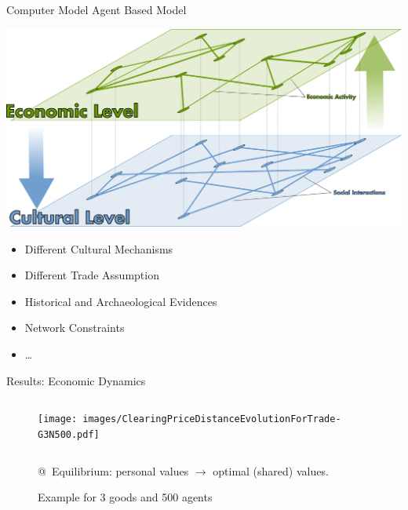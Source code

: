 \documentclass[10pt, notes=show]{beamer}
\begin{document}
\begin{frame}{Computer Model}
    \vfill
    Agent Based Model
    \begin{center}
	\includegraphics[width=.5\textwidth]{images/cooev.png}	
    \end{center}
    \vfill
	\begin{itemize}
	\item Different Cultural Mechanisms
    \vfill
	\item Different Trade Assumption
    \vfill
	\item Historical and Archaeological Evidences 
    \vfill
	\item Network Constraints
    \vfill
	\item \dots
    \vfill
	\end{itemize}
\end{frame}
	


\begin{frame}{Results: Economic Dynamics}
	\begin{figure}
	    \caption{Example for 3 goods and 500 agents}
	    \begin{columns}
		\texttt{[image: images/ClearingPriceDistanceEvolutionForTrade-G3N500.pdf]}\\
	    \end{columns}
		@~Equilibrium: personal values  $\rightarrow$ optimal (shared) values.
	\end{figure}
	
\end{frame}
\end{document}
